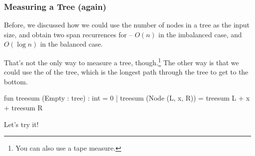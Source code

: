 \documentclass[aspectratio=169]{beamer}
\begin{document}

\begin{frame}[fragile]
  \frametitle{Measuring a Tree (again)}

  Before, we discussed how we could use the number of nodes in a tree as the input
  size, and obtain two span recurrences for  -- $O(n)$ in the imbalanced
  case, and $O(\log n)$ in the balanced case.

  \pause
  \vspace{\fill}

  That's not the only way to measure a tree, though.\footnote{You can also use a tape measure.} The other way is that we could
  use the  of the tree, which is the longest path through the tree to
  get to the bottom.

  \pause
  \vspace{\fill}

  \begin{codeblock}
    fun treesum (Empty : tree) : int = 0
      | treesum (Node (L, x, R)) = treesum L + x + treesum R
  \end{codeblock}

  \vspace{\fill}

  Let's try it!
\end{frame}
\end{document}
